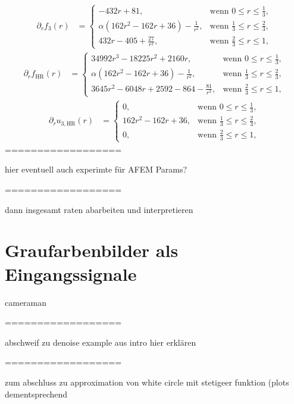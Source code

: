 \begin{align*}
  \partial_r f_3(r) &=
  \begin{cases}
    - 432r + 81, & \text{wenn } 0\leq r\leq\frac{1}{3},\\
    \alpha\left(162r^2 - 162r + 36\right) - \frac{1}{r^2}, & 
    \text{wenn } \frac{1}{3}\leq r\leq \frac{2}{3},\\
    432r - 405 + \frac{27}{r^2}, & 
    \text{wenn } \frac{2}{3}\leq r\leq 1,
  \end{cases}
\end{align*}
\begin{align*}
  \partial_r f_\textrm{HR}(r) &=
  \begin{cases}
    34992r^3 - 18225r^2 + 2160r, & \text{wenn } 0\leq r\leq\frac{1}{3},\\
    \alpha\left(162r^2 - 162r + 36\right) - \frac{1}{r^2}, & 
    \text{wenn } \frac{1}{3}\leq r\leq \frac{2}{3},\\
    3645r^2 - 6048r + 2592 - 864 - \frac{81}{r^2}, & 
    \text{wenn } \frac{2}{3}\leq r\leq 1,
  \end{cases}
\end{align*}
\begin{align*}
  \partial_r u_{3,\textrm{HR}}(r) &=
  \begin{cases}
    0, & \text{wenn } 0\leq r\leq\frac{1}{3},\\
    162r^2 - 162r + 36, & 
    \text{wenn } \frac{1}{3}\leq r\leq \frac{2}{3},\\
    0, & \text{wenn } \frac{2}{3}\leq r\leq 1,
  \end{cases}
\end{align*}
==================

hier eventuell auch experimte für AFEM Params?

==================

dann insgesamt raten abarbeiten und interpretieren


\section{Graufarbenbilder als Eingangssignale}
cameraman

==================

abschweif zu denoise example aus intro hier erklären

==================

zum abschluss zu approximation von white circle mit stetigeer funktion (plots
dementsprechend

